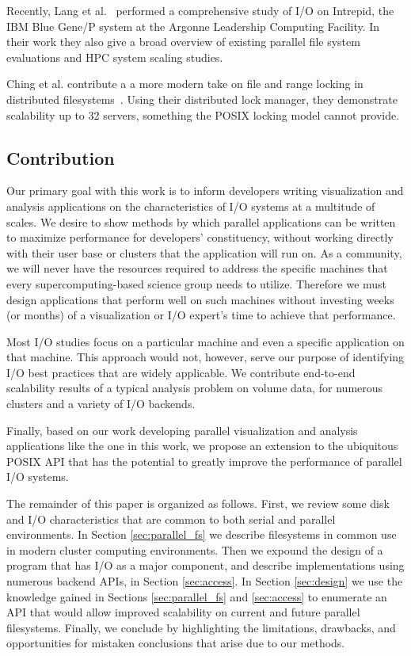 Recently, Lang et al.~\cite{Lang:2009:IPCA} performed a comprehensive
study of I/O on Intrepid, the IBM Blue Gene/P system at the Argonne
Leadership Computing Facility. In their work they also give a broad
overview of existing parallel file system evaluations and HPC system
scaling studies.

Ching et al. contribute a a more modern take on file and range locking
in distributed filesystems~\cite{Ching:2007:Locking}.  Using their
distributed lock manager, they demonstrate scalability up to 32
servers, something the POSIX locking model cannot provide.

\subsection{Contribution}\label{sec:contribution}

Our primary goal with this work is to inform developers writing
visualization and analysis applications on the characteristics of
I/O systems at a multitude of scales.  We desire to show methods by
which parallel applications can be written to maximize performance for
developers' constituency, without working directly with their user base
or clusters that the application will run on.  As a community, we will
never have the resources required to address the specific machines that
every supercomputing-based science group needs to utilize.  Therefore
we must design applications that perform well on such machines without
investing weeks (or months) of a visualization or I/O expert's time to
achieve that performance.

Most I/O studies focus on a particular machine and even a specific
application on that machine.  This approach would not, however,
serve our purpose of identifying I/O best practices that are widely
applicable.  We contribute end-to-end scalability results of a typical
analysis problem on volume data, for numerous clusters and a variety of
I/O backends.

Finally, based on our work developing parallel visualization and
analysis applications like the one in this work, we propose an
extension to the ubiquitous POSIX API that has the potential to
greatly improve the performance of parallel I/O systems.

The remainder of this paper is organized as follows.  First, we review
some disk and I/O characteristics that are common to both serial and
parallel environments.  In Section \ref{sec:parallel_fs} we describe
filesystems in common use in modern cluster computing environments.
Then we expound the design of a program that has I/O as a major
component, and describe implementations using numerous backend APIs, in
Section \ref{sec:access}.  In Section \ref{sec:design} we use the
knowledge gained in Sections
\ref{sec:parallel_fs} and \ref{sec:access} to enumerate an API that
would allow improved scalability on current and future parallel
filesystems.  Finally, we conclude by highlighting the limitations,
drawbacks, and opportunities for mistaken conclusions that arise due
to our methods.

